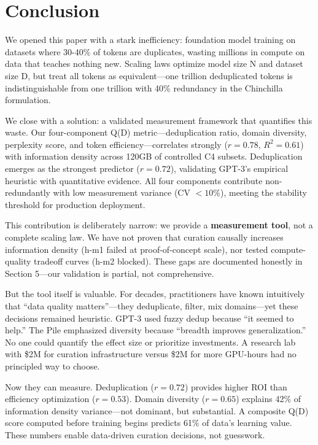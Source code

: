 \section{Conclusion}

We opened this paper with a stark inefficiency: foundation model training on datasets where 30-40\% of tokens are duplicates, wasting millions in compute on data that teaches nothing new. Scaling laws optimize model size N and dataset size D, but treat all tokens as equivalent---one trillion deduplicated tokens is indistinguishable from one trillion with 40\% redundancy in the Chinchilla formulation.

We close with a solution: a validated measurement framework that quantifies this waste. Our four-component Q(D) metric---deduplication ratio, domain diversity, perplexity score, and token efficiency---correlates strongly ($r = 0.78$, $R^2 = 0.61$) with information density across 120GB of controlled C4 subsets. Deduplication emerges as the strongest predictor ($r = 0.72$), validating GPT-3's empirical heuristic with quantitative evidence. All four components contribute non-redundantly with low measurement variance (CV $< 10\%$), meeting the stability threshold for production deployment.

This contribution is deliberately narrow: we provide a \textbf{measurement tool}, not a complete scaling law. We have not proven that curation causally increases information density (h-m1 failed at proof-of-concept scale), nor tested compute-quality tradeoff curves (h-m2 blocked). These gaps are documented honestly in Section 5---our validation is partial, not comprehensive.

But the tool itself is valuable. For decades, practitioners have known intuitively that ``data quality matters''---they deduplicate, filter, mix domains---yet these decisions remained heuristic. GPT-3 used fuzzy dedup because ``it seemed to help.'' The Pile emphasized diversity because ``breadth improves generalization.'' No one could quantify the effect size or prioritize investments. A research lab with \$2M for curation infrastructure versus \$2M for more GPU-hours had no principled way to choose.

Now they can measure. Deduplication ($r = 0.72$) provides higher ROI than efficiency optimization ($r = 0.53$). Domain diversity ($r = 0.65$) explains 42\% of information density variance---not dominant, but substantial. A composite Q(D) score computed before training begins predicts 61\% of data's learning value. These numbers enable data-driven curation decisions, not guesswork.

